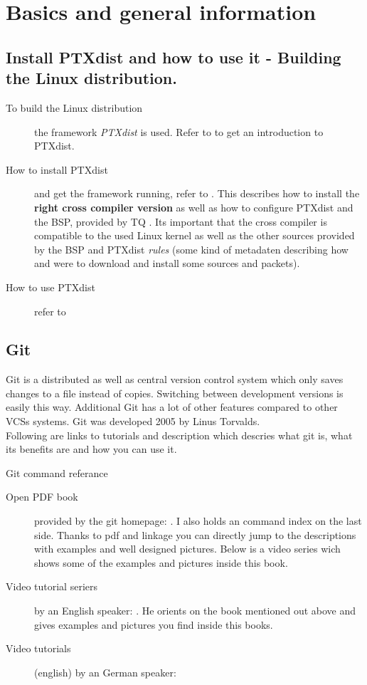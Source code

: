 \chapter{Basics and general information}%
\label{cha:Basics and general information}


\section{Install PTXdist and how to use it - Building the Linux distribution. }%
\label{sec:Building the Linux distribution}

\begin{description}
    \item[To build the Linux distribution] the framework \textit{PTXdist} is
        used. Refer to \cite{PTXdist} to get an introduction to PTXdist.
    \item[How to install PTXdist] and get the framework running, refer to
        \cite{install_ptxdist}. This describes how to install the
        \textbf{right cross compiler version} as well as how to configure
        PTXdist and the BSP, provided by TQ \cite[TQ BSP]{BSP_119}. Its
        important that the cross compiler is compatible to the used Linux kernel
        as well as the other sources provided by the BSP and PTXdist
        \textit{rules} (some kind of \gls{metadaten} describing how and were to
        download and install some sources and packets).
    \item[How to use PTXdist] refer to \cite[PTXdist manual]{ptxdist_manual}
\end{description}


\section{Git}%
\label{sec:Building the Linux distribution}
Git is a distributed as well as central version control system which only saves
changes to a file instead of copies. Switching between development versions is
easily this way. Additional Git has a lot of other features compared to other
\glspl{VCS} systems. Git was developed 2005 by Linus Torvalds.
\\
Following are links to tutorials and description which
descries what git is, what its benefits are  and how you can use it.


\begin{description}
    \item[Git command referance] \cite{gitdoc}
    \item[Open PDF book] provided by the git homepage: \cite{Chacon2014}. I also
        holds an command index on the last side. Thanks to pdf and linkage you
        can directly jump to the descriptions with examples and well designed
        pictures. Below is a video series wich shows some of the examples and
        pictures inside this book.
    \item[Video tutorial seriers] by an English speaker:
        \cite{gitvideotutorial_en}. He orients on the book mentioned out above
        and gives examples and pictures you find inside this books.
    \item[Video tutorials] (english) by an German speaker:
        \cite{gitvideotutorial_de_en}
\end{description}
